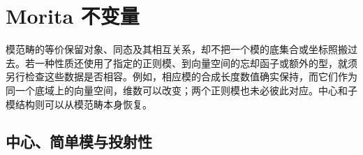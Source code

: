 
\section{Morita 不变量}
\label{b2:sec:1604}

模范畴的等价保留对象、同态及其相互关系，却不把一个模的底集合或坐标照搬过去。若一种性质还使用了指定的正则模、到向量空间的忘却函子或额外的型，就须另行检查这些数据是否相容。例如，相应模的合成长度数值确实保持，而它们作为同一个底域上的向量空间，维数可以改变；两个正则模也未必彼此对应。中心和子模结构则可以从模范畴本身恢复。

%
%

\subsection{中心、简单模与投射性}
\label{b2:subsec:1604:01}

